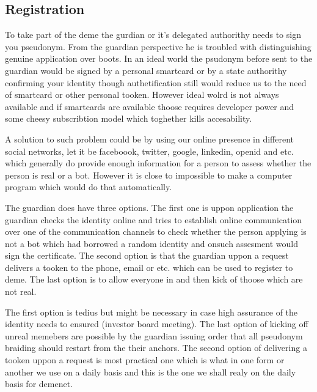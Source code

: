 \documentclass{article}
\begin{document}
\subsection{Registration}

To take part of the deme the gurdian or it's delegated authorithy needs to sign you pseudonym. From the guardian perspective he is troubled with distinguishing genuine application over boots. In an ideal world the psudonym before sent to the guardian would be signed by a personal smartcard or by a state authorithy confirming your identity though authetification still would reduce us to the need of smartcard or other personal tooken. However ideal wolrd is not always available and if smartcards are available thoose requires developer power and some cheesy subscribtion model which toghether kills accesability.

A solution to such problem could be by using our online presence in different social networks, let it be faceboook, twitter, google, linkedin, openid and etc. which generally do provide enough information for a person to assess whether the person is real or a bot. However it is close to impossible to make a computer program which would do that automatically.

The guardian does have three options. The first one is uppon application the guardian checks the identity online and tries to establish online communication over one of the communication channels to check whether the person applying is not a bot which had borrowed a random identity and onsuch assesment would sign the certificate. The second option is that the guardian uppon a request delivers a tooken to the phone, email or etc. which can be used to register to deme. The last option is to allow everyone in and then kick of thoose which are not real.

The first option is tedius but might be necessary in case high assurance of the identity needs to ensured (investor board meeting). The last option of kicking off unreal memebers are possible by the guardian issuing order that all pseudonym braiding should restart from the their anchors. The second option of delivering a tooken uppon a request is most practical one which is what in one form or another we use on a daily basis and this is the one we shall realy on the daily basis for demenet.
\end{document}
